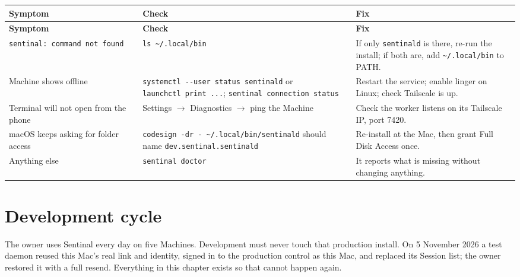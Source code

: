 \begin{small}
\begin{longtable}{>{\raggedright\arraybackslash}p{0.197\dimexpr \linewidth-6\tabcolsep\relax}>{\raggedright\arraybackslash}p{0.401\dimexpr \linewidth-6\tabcolsep\relax}>{\raggedright\arraybackslash}p{0.401\dimexpr \linewidth-6\tabcolsep\relax}}
\toprule
\textbf{Symptom} & \textbf{Check} & \textbf{Fix} \\
\midrule
\endfirsthead
\toprule
\textbf{Symptom} & \textbf{Check} & \textbf{Fix} \\
\midrule
\endhead
\texttt{sentinal:\allowbreak{}\ command\ not\ found} & \texttt{ls\ \textasciitilde{}/\allowbreak{}.\allowbreak{}local/\allowbreak{}bin} & If only \texttt{sentinald} is there, re-run the install; if both are, add \texttt{\textasciitilde{}/\allowbreak{}.\allowbreak{}local/\allowbreak{}bin} to PATH. \\
Machine shows offline & \texttt{systemctl\ -{}\allowbreak{}-{}\allowbreak{}user\ status\ sentinald} or \texttt{launchctl\ print\ .\allowbreak{}.\allowbreak{}.\allowbreak{}}; \texttt{sentinal\ connection\ status} & Restart the service; enable linger on Linux; check Tailscale is up. \\
Terminal will not open from the phone & Settings $\rightarrow$ Diagnostics $\rightarrow$ ping the Machine & Check the worker listens on its Tailscale IP, port 7420. \\
macOS keeps asking for folder access & \texttt{codesign\ -{}\allowbreak{}dr\ -{}\allowbreak{}\ \textasciitilde{}/\allowbreak{}.\allowbreak{}local/\allowbreak{}bin/\allowbreak{}sentinald} should name \texttt{dev.\allowbreak{}sentinal.\allowbreak{}sentinald} & Re-install at the Mac, then grant Full Disk Access once. \\
Anything else & \texttt{sentinal\ doctor} & It reports what is missing without changing anything. \\
\bottomrule
\end{longtable}
\end{small}

\chapter{Development cycle}

The owner uses Sentinal every day on five Machines. Development must never touch that production install. On 5 November 2026 a test daemon reused this Mac's real link and identity, signed in to the production control as this Mac, and replaced its Session list; the owner restored it with a full resend. Everything in this chapter exists so that cannot happen again.

